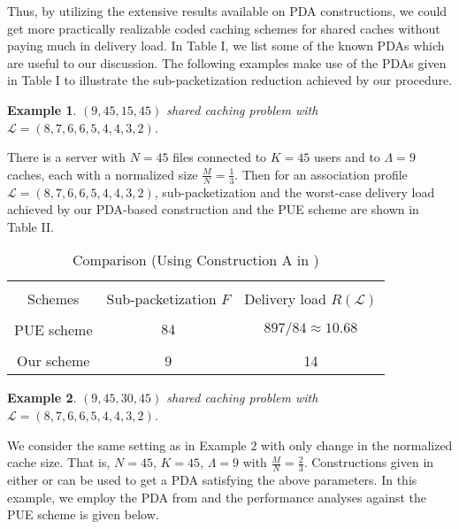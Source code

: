 \documentclass[conference,a4paper,10pt]{IEEEtran}
\newtheorem{example}{Example}
\begin{document}
Thus, by utilizing the extensive results available on PDA constructions, we could get more practically realizable coded caching schemes for shared caches without paying much in delivery load. In Table I, we list some of the known PDAs which are useful to our discussion. The following examples make use of the PDAs given in Table I to illustrate the sub-packetization reduction achieved by our procedure. 

\begin{example}
$(9,45,15,45)$ shared caching problem with $\mathcal{L}=(8,7,6,6,5,4,4,3,2)$.
\end{example}

There is a server with $N=45$ files connected to $K=45$ users and to $\Lambda = 9$ caches, each with a normalized size $\frac{M}{N}=\frac{1}{3}$. Then for an association profile $\mathcal{L}=(8,7,6,6,5,4,4,3,2)$, sub-packetization and the worst-case delivery load achieved by our PDA-based construction and the PUE scheme are shown in Table II.

\begin{table}[ht]
\centering
\caption{Comparison (Using Construction A in \cite{YCT})}
\begin{tabular}{ c c c }
\hline
\\
Schemes & \makecell{Sub-packetization\\ $F$} & \makecell{Delivery load\\ $R(\mathcal{L})$} \\
\hline
\\

PUE scheme \cite{PUE}	& $84$  & $897/84 \approx 10.68$ \\
\\
Our scheme & 9 & 14 \\
\hline
\end{tabular}
\label{tab:multicol}
\end{table}


\begin{example}
$(9,45,30,45)$ shared caching problem with $\mathcal{L}=(8,7,6,6,5,4,4,3,2)$.
\end{example}
We consider the same setting as in Example $2$ with only change in the normalized cache size. That is, $N=45$, $K=45$, $\Lambda=9$ with $\frac{M}{N}=\frac{2}{3}$. Constructions given in either \cite{YCT}  or \cite{PDA2} can be used to get a PDA satisfying the above parameters. In this example, we employ the PDA from \cite{PDA2} and the performance analyses against the PUE scheme is given below.
\end{document}
